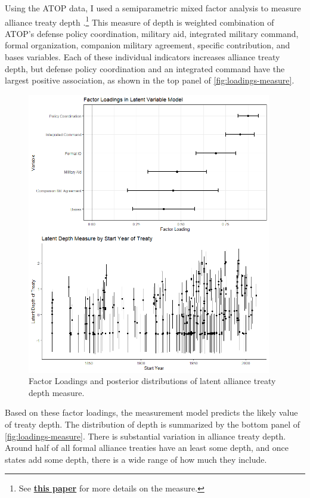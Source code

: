 \documentclass[12pt]{article}
\begin{document}
Using the ATOP data, I used a semiparametric mixed factor analysis to measure alliance treaty depth \citep{Murrayetal2013}.\footnote{See \textbf{\href{https://github.com/joshuaalley/arms-allies/blob/master/manuscript/arms-allies-paper.pdf}{this paper}} for more details on the measure.}
This measure of depth is weighted combination of ATOP's defense policy coordination, military aid, integrated military command, formal organization, companion military agreement, specific contribution, and bases variables. 
Each of these individual indicators increases alliance treaty depth, but defense policy coordination and an integrated command have the largest positive association, as shown in the top panel of \autoref{fig:loadings-measure}. 


\begin{figure}[hbtp]
\centering
\includegraphics[width=0.95\textwidth]{../figures/loadings-measure.png}
\caption{Factor Loadings and posterior distributions of latent alliance treaty depth measure.}
\label{fig:loadings-measure}
\end{figure}


Based on these factor loadings, the measurement model predicts the likely value of treaty depth. 
The distribution of depth is summarized by the bottom panel of \autoref{fig:loadings-measure}. 
There is substantial variation in alliance treaty depth. 
Around half of all formal alliance treaties have an least some depth, and once states add some depth, there is a wide range of how much they include.
\end{document}

